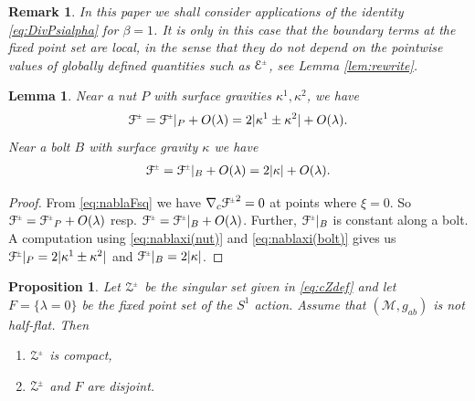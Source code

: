 \documentclass[a4paper,10pt,reqno]{amsart}
\newcommand{\nut}{P}
\newcommand{\bolt}{B}
\newcommand{\cE}{\mathcal{E}}
\newcommand{\cZ}{\mathcal{Z}}
\newcommand{\cM}{\mathcal{M}}
\theoremstyle{plain}
\newtheorem{lemma}[thm]{Lemma}
\newtheorem{prop}[thm]{Proposition}
\newtheorem{remark}[thm]{Remark}
\newcommand{\PM}[1]{{{#1}^{\hspace{-.5pt}\scaleto{\pm}{3.5pt}}}}
\newcommand{\Fixed}{F}
\def\Fcal{\mathcal{F}}
\numberwithin{equation}{section}
\begin{document}
\begin{remark} \label{rem:beta}
In this paper we shall consider applications of the identity \eqref{eq:DivPsialpha} for $\beta=1$. It is only in this case that the boundary terms at the fixed point set are local, in the sense that they do not depend on the pointwise values of globally defined quantities such as $\PM{\cE}$, see Lemma \ref{lem:rewrite}. 
\end{remark} 

\begin{lemma} \label{lem:Fcalprop} 
Near a nut $\nut$ with surface gravities $\kappa^1, \kappa^2$, we have
\begin{align}
\PM{\Fcal} 
= \PM{\Fcal}|_\nut + O(\lambda)
= 2|\kappa^1 \pm \kappa^2| + O(\lambda).
\end{align}
Near a bolt $\bolt$ with surface gravity $\kappa$ we have 
\begin{align}
\PM{\Fcal} 
= \PM{\Fcal}|_\bolt + O(\lambda)
= 2|\kappa| + O(\lambda).
\end{align}
\end{lemma} 

\begin{proof} 
From \eqref{eq:nablaFsq} we have $\nabla_{c}\PM{\Fcal}^2 = 0$ at points where $\xi=0$. So $\PM{\Fcal} = \PM{\Fcal}_\nut + O(\lambda)$ resp. $\PM{\Fcal} = \PM{\Fcal}|_\bolt + O(\lambda)$. Further, $\PM{\Fcal}|_\bolt$ is constant along a bolt. A computation using \eqref{eq:nablaxi(nut)} and \eqref{eq:nablaxi(bolt)} gives us $\PM{\Fcal}|_\nut = 2|\kappa^1 \pm \kappa^2|$ and $\PM{\Fcal}|_\bolt = 2|\kappa|$.
\end{proof}

\begin{prop} \label{prop:cZ-properties}
Let $\PM{\cZ}$ be the singular set given in \eqref{eq:cZdef} and let $\Fixed = \{ \lambda = 0 \}$ be the fixed point set of the $S^1$ action.  Assume that $(\cM, g_{ab})$ is not half-flat. Then
\begin{enumerate}
\item $\PM{\cZ}$ is compact,
\item $\PM{\cZ}$ and $\Fixed$ are disjoint.
\end{enumerate}
\end{prop}
\end{document}
